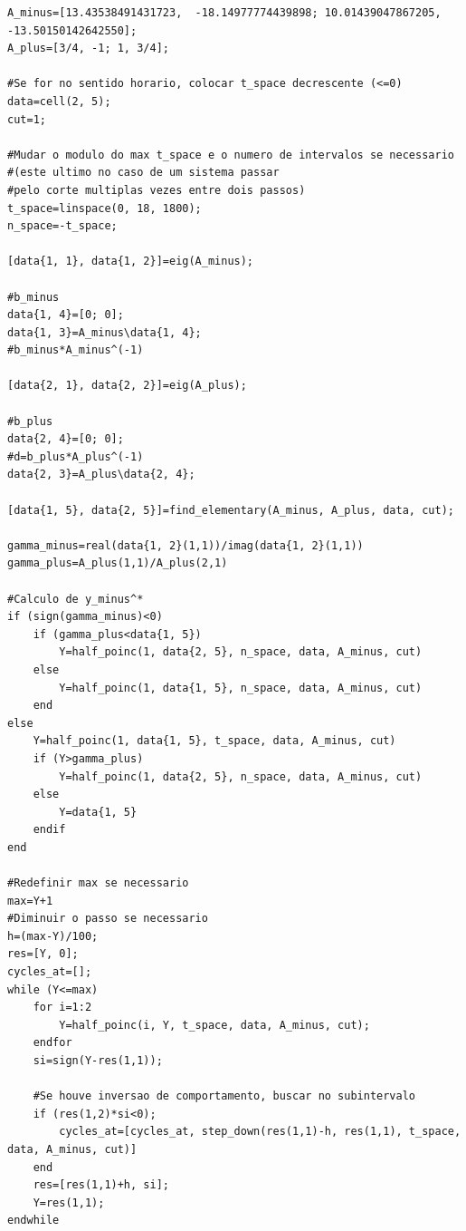 \begin{lstlisting}[caption={Busca por ciclos limite de $P$ para $b^\pm$ possivelmente n\~{a}o nulo.}, captionpos=b]
A_minus=[13.43538491431723,  -18.14977774439898; 10.01439047867205,  -13.50150142642550];
A_plus=[3/4, -1; 1, 3/4];

#Se for no sentido horario, colocar t_space decrescente (<=0)
data=cell(2, 5);
cut=1;

#Mudar o modulo do max t_space e o numero de intervalos se necessario 
#(este ultimo no caso de um sistema passar 
#pelo corte multiplas vezes entre dois passos)
t_space=linspace(0, 18, 1800);
n_space=-t_space;

[data{1, 1}, data{1, 2}]=eig(A_minus);

#b_minus
data{1, 4}=[0; 0];
data{1, 3}=A_minus\data{1, 4};
#b_minus*A_minus^(-1)

[data{2, 1}, data{2, 2}]=eig(A_plus);

#b_plus
data{2, 4}=[0; 0];
#d=b_plus*A_plus^(-1)
data{2, 3}=A_plus\data{2, 4};

[data{1, 5}, data{2, 5}]=find_elementary(A_minus, A_plus, data, cut);

gamma_minus=real(data{1, 2}(1,1))/imag(data{1, 2}(1,1))
gamma_plus=A_plus(1,1)/A_plus(2,1)

#Calculo de y_minus^*
if (sign(gamma_minus)<0)
    if (gamma_plus<data{1, 5})
        Y=half_poinc(1, data{2, 5}, n_space, data, A_minus, cut) 
    else
        Y=half_poinc(1, data{1, 5}, n_space, data, A_minus, cut) 
    end
else
    Y=half_poinc(1, data{1, 5}, t_space, data, A_minus, cut)
    if (Y>gamma_plus)
        Y=half_poinc(1, data{2, 5}, n_space, data, A_minus, cut)        
    else
        Y=data{1, 5}
    endif
end

#Redefinir max se necessario
max=Y+1
#Diminuir o passo se necessario
h=(max-Y)/100;
res=[Y, 0];
cycles_at=[];
while (Y<=max)
    for i=1:2
        Y=half_poinc(i, Y, t_space, data, A_minus, cut);
    endfor
    si=sign(Y-res(1,1));
    
    #Se houve inversao de comportamento, buscar no subintervalo
    if (res(1,2)*si<0);
        cycles_at=[cycles_at, step_down(res(1,1)-h, res(1,1), t_space, data, A_minus, cut)]
    end
    res=[res(1,1)+h, si];
    Y=res(1,1);
endwhile
\end{lstlisting}